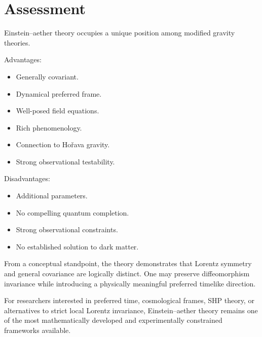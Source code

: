 \section{Assessment}

Einstein--aether theory occupies a unique position among modified
gravity theories.

Advantages:

\begin{itemize}
\item Generally covariant.
\item Dynamical preferred frame.
\item Well-posed field equations.
\item Rich phenomenology.
\item Connection to Ho\v rava gravity.
\item Strong observational testability.
\end{itemize}

Disadvantages:

\begin{itemize}
\item Additional parameters.
\item No compelling quantum completion.
\item Strong observational constraints.
\item No established solution to dark matter.
\end{itemize}

From a conceptual standpoint, the theory demonstrates that
Lorentz symmetry and general covariance are logically distinct.
One may preserve diffeomorphism invariance while introducing a
physically meaningful preferred timelike direction.

For researchers interested in preferred time,
cosmological frames, SHP theory, or alternatives to strict local
Lorentz invariance, Einstein--aether theory remains one of the
most mathematically developed and experimentally constrained
frameworks available.
